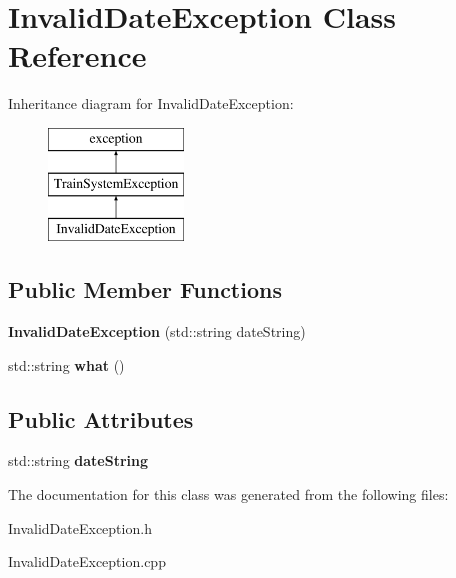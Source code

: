 \hypertarget{classInvalidDateException}{}\section{Invalid\+Date\+Exception Class Reference}
\label{classInvalidDateException}
Inheritance diagram for Invalid\+Date\+Exception\+:\begin{figure}[H]
\begin{center}
\leavevmode
\includegraphics[height=3.000000cm]{classInvalidDateException}
\end{center}
\end{figure}
\subsection*{Public Member Functions}
\begin{DoxyCompactItemize}
\item 
\mbox{\label{classInvalidDateException_a0ae7a8a97c0442fc025cb63e3b86bee8}} 
{\bfseries Invalid\+Date\+Exception} (std\+::string date\+String)
\item 
\mbox{\label{classInvalidDateException_a518618417b66ea59ef6d5a40aad7d045}} 
std\+::string {\bfseries what} ()
\end{DoxyCompactItemize}
\subsection*{Public Attributes}
\begin{DoxyCompactItemize}
\item 
\mbox{\label{classInvalidDateException_a70664a8f1fe8853eed11199c5c0f0060}} 
std\+::string {\bfseries date\+String}
\end{DoxyCompactItemize}


The documentation for this class was generated from the following files\+:\begin{DoxyCompactItemize}
\item 
Invalid\+Date\+Exception.\+h\item 
Invalid\+Date\+Exception.\+cpp\end{DoxyCompactItemize}
